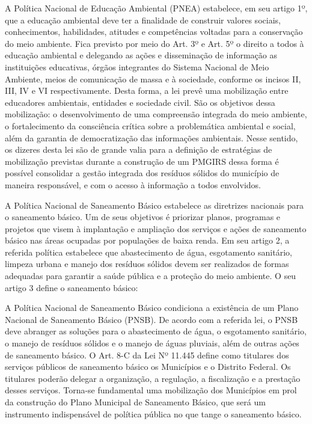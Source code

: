	A Política Nacional de Educação Ambiental (PNEA) estabelece, em seu artigo 1º, que a educação ambiental deve ter a finalidade de construir valores sociais, conhecimentos, habilidades, atitudes e competências voltadas para a conservação do meio ambiente. Fica previsto por meio do Art. 3º e Art. 5º o direito a todos à educação ambiental e delegando as ações e disseminação de informação as instituições educativas, órgãos integrantes do Sistema Nacional de Meio Ambiente, meios de comunicação de massa e à sociedade, conforme os incisos II, III, IV e VI respectivamente. Desta forma, a lei \cite{L979597:online} prevê uma mobilização entre educadores ambientais, entidades e sociedade civil. São os objetivos dessa mobilização: o desenvolvimento de uma compreensão integrada do meio ambiente, o fortalecimento da consciência crítica sobre a problemática ambiental e social, além da garantia de democratização das informações ambientais.  Nesse sentido, os dizeres desta lei são de grande valia para a definição de estratégias de mobilização previstas durante a construção de um PMGIRS dessa forma é possível consolidar a gestão integrada dos resíduos sólidos do município de maneira responsável, e com o acesso à informação a todos envolvidos.
	
	A Política Nacional de Saneamento Básico estabelece as diretrizes nacionais para o saneamento básico. Um de seus objetivos é priorizar planos, programas e projetos que visem à implantação e ampliação dos serviços e ações de saneamento básico nas áreas ocupadas por populações de baixa renda. Em seu artigo 2, a referida política estabelece que abastecimento de água, esgotamento sanitário, limpeza urbana e manejo dos resíduos sólidos devem ser realizados de formas adequadas para garantir a saúde pública e a proteção do meio ambiente. O seu artigo 3 define o saneamento básico:
	
	A Política Nacional de Saneamento Básico condiciona a existência de um Plano Nacional de Saneamento Básico (PNSB). De acordo com a referida lei, o PNSB deve abranger as soluções para o abastecimento de água, o esgotamento sanitário, o manejo de resíduos sólidos e o manejo de águas pluviais, além de outras ações de saneamento básico. O Art. 8-C da Lei Nº 11.445 define como titulares dos serviços públicos de saneamento básico os Municípios e o Distrito Federal. Os titulares poderão delegar a organização, a regulação, a fiscalização e a prestação desses serviços. Torna-se fundamental uma mobilização dos Municípios em prol da construção do Plano Municipal de Saneamento Básico, que será um instrumento indispensável de política pública no que tange o saneamento básico.
	
